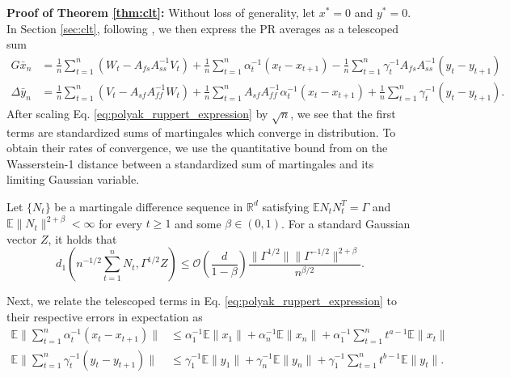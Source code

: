 \textbf{Proof of Theorem \ref{thm:clt}:}
Without loss of generality, let $x^* = 0$ and $y^* = 0$.
In Section \ref{sec:clt}, following \citet{mokkadem2006convergence}, we then express the PR averages as a telescoped sum
\begin{equation}
    \begin{split}
        G \bar{x}_n  &= \frac{1}{n} \sum_{t=1}^n (W_t - A_{fs} A_{ss}^{-1} V_t) + \frac{1}{n} \sum_{t=1}^n \alpha_t^{-1} (x_{t} - x_{t+1}) - \frac{1}{n} \sum_{t=1}^n \gamma_t^{-1} A_{fs} A_{ss}^{-1} (y_t - y_{t+1}) \\ 
        \Delta \bar{y}_n &= \frac{1}{n} \sum_{t=1}^n (V_t - A_{sf} A_{ff}^{-1} W_t) 
        + \frac{1}{n}\sum_{t=1}^n A_{sf} A_{ff}^{-1} \alpha_t^{-1} (x_{t} - x_{t+1})
        + \frac{1}{n}\sum_{t=1}^n \gamma_t^{-1} (y_{t} - y_{t+1})  .    
    \end{split}
    \label{eq:polyak_ruppert_expression}
\end{equation}
After scaling Eq. \eqref{eq:polyak_ruppert_expression} by $\sqrt{n}$, we see that the first terms are standardized sums of martingales which converge in distribution. 
To obtain their rates of convergence, we use the quantitative bound from \citep{srikant2024CLT} on the Wasserstein-1 distance between a standardized sum of martingales and its limiting Gaussian variable. 
\begin{lemma}\label{lem:CLT}
    Let $\{N_t\}$ be a martingale difference sequence in $\mathbb{R}^d$ satisfying $\mathbb{E}N_t N_t^T = \Gamma$ and $\mathbb{E}\lVert N_t \rVert^{2 + \beta}<\infty$ for every $t \geq 1$ and some $\beta \in (0, 1)$. 
    For a standard Gaussian vector $Z$, it holds that
    \begin{equation}
        d_1 \left(n^{-1/2} \sum_{t=1}^n N_t , \Gamma^{1/2} Z \right) \leq \mathcal{O}\left(\frac{d}{1 - \beta}\right) \frac{\lVert \Gamma^{1/2} \rVert \lVert \Gamma^{-1/2}\rVert^{2 + \beta}}{n^{\beta/2}} .
    \end{equation}
\end{lemma}
Next, we relate the telescoped terms in Eq. \eqref{eq:polyak_ruppert_expression} to their respective errors in expectation as
\begin{equation}
    \begin{split}
        \mathbb{E}\lVert \sum_{t=1}^n \alpha_t^{-1} (x_t - x_{t+1}) \rVert 
            &\leq 
        \alpha_1^{-1} \mathbb{E} \lVert x_1 \rVert + \alpha_n^{-1} \mathbb{E}\lVert x_n \rVert + \alpha_1^{-1} \sum_{t=1}^n t^{a-1} \mathbb{E}\lVert x_t \rVert  
        \\
        \mathbb{E}\lVert \sum_{t=1}^n \gamma_t^{-1} (y_t - y_{t+1}) \rVert 
            &\leq 
        \gamma_1^{-1} \mathbb{E} \lVert y_1 \rVert + \gamma_n^{-1} \mathbb{E}\lVert y_n \rVert + \gamma_1^{-1} \sum_{t=1}^n t^{b-1} \mathbb{E}\lVert y_t \rVert .
    \end{split}
    \label{eq:pr_expression}
\end{equation}
